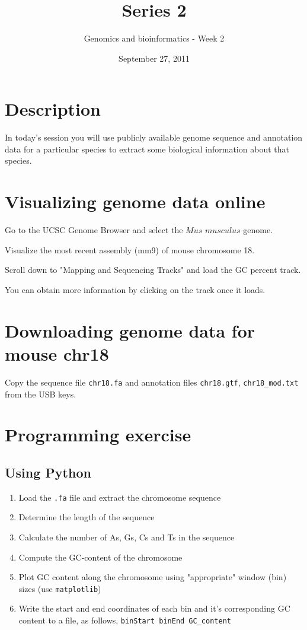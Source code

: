 \documentclass[a4paper,11pt]{article}
\title{Series 2}
\date{September 27, 2011}
\author{Genomics and bioinformatics - Week 2}
\begin{document}
\maketitle

\section{Description}
In today's session you will use publicly available genome sequence and annotation data for a particular species
to extract some biological information about that species.


\section{Visualizing genome data online}

Go to the UCSC Genome Browser and select the $Mus$ $musculus$ genome.

Visualize the most recent assembly (mm9) of mouse chromosome 18.

Scroll down to "Mapping and Sequencing Tracks" and load the GC percent track. 

You can obtain more information by clicking on the track once it loads.  

\section{Downloading genome data for mouse chr18}
Copy the sequence file \texttt{chr18.fa} and annotation files \texttt{chr18.gtf}, \texttt{chr18\_mod.txt} from the USB keys.

\section{Programming exercise}

\subsection{Using Python}
\begin{enumerate}
\item Load the \texttt{.fa} file and extract the chromosome sequence
\item Determine the length of the sequence
\item Calculate the number of As, Gs, Cs and Ts in the sequence
\item Compute the GC-content of the chromosome
\item Plot GC content along the chromosome using "appropriate" window (bin) sizes (use  \texttt{matplotlib})
\item Write the start and end coordinates of each bin and it's corresponding GC content to a file, as follows,
\scriptsize\texttt {binStart binEnd	GC\_content}
\end{enumerate}
\end{document}
